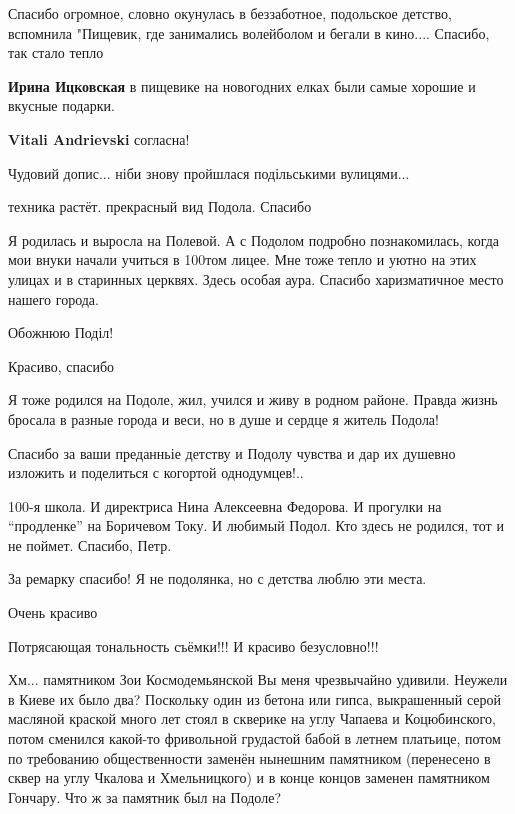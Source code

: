 \begin{itemize}

Спасибо огромное, словно окунулась в беззаботное, подольское детство,
вспомнила "Пищевик, где занимались волейболом и бегали в кино.... Спасибо, так
стало тепло

\begin{itemize} %
\textbf{Ирина Ицковская} в пищевике на новогодних елках были самые хорошие и вкусные подарки.

\textbf{Vitali Andrievski} согласна!
\end{itemize} %


Чудовий допис... ніби знову пройшлася подільськими вулицями...


техника растёт. прекрасный вид Подола. Спасибо


Я родилась и выросла на Полевой. А с Подолом подробно познакомилась, когда мои
внуки начали учиться в 100том лицее. Мне тоже тепло и уютно на этих улицах и в
старинных церквях. Здесь особая аура. Спасибо харизматичное место нашего
города.


Обожнюю Поділ!

Красиво, спасибо

Я тоже родился на Подоле, жил, учился и живу в родном районе.
Правда жизнь бросала в разные города и веси, но в душе и сердце я житель Подола!


Спасибо за ваши преданньіе детству и Подолу чувства и дар их душевно изложить и
поделиться с когортой однодумцев!..


100-я школа. И директриса Нина Алексеевна Федорова. И прогулки на \enquote{продленке}
на Боричевом Току. И любимый Подол. Кто здесь не родился, тот и не поймет.
Спасибо, Петр.

За ремарку спасибо! Я не подолянка, но с детства люблю эти места.

Очень красиво

Потрясающая тональность съёмки!!! И красиво безусловно!!!


Хм... памятником Зои Космодемьянской Вы меня чрезвычайно удивили. Неужели в
Киеве их было два? Поскольку один из бетона или гипса, выкрашенный серой
масляной краской много лет стоял в скверике на углу Чапаева и Коцюбинского,
потом сменился какой-то фривольной грудастой бабой в летнем платьице, потом по
требованию общественности заменён нынешним памятником (перенесено в сквер на
углу Чкалова и Хмельницкого) и в конце концов заменен памятником Гончару. Что ж
за памятник был на Подоле?


\end{itemize}
